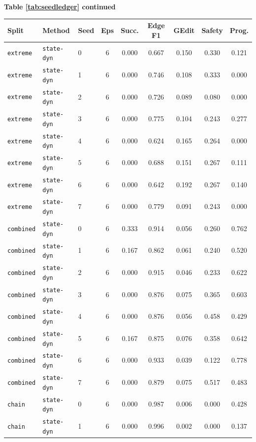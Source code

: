 \documentclass{article}
\begin{document}
\begin{center}
\textbf{Table \ref{tab:seedledger} continued}\\[0.4ex]
\begin{tabular}{lllcccccc}
\toprule
Split & Method & Seed & Eps & Succ. & Edge F1 & GEdit & Safety & Prog. \\
\midrule
\texttt{extreme} & \texttt{state-dyn} & 0 & 6 & 0.000 & 0.667 & 0.150 & 0.330 & 0.121 \\
\texttt{extreme} & \texttt{state-dyn} & 1 & 6 & 0.000 & 0.746 & 0.108 & 0.333 & 0.000 \\
\texttt{extreme} & \texttt{state-dyn} & 2 & 6 & 0.000 & 0.726 & 0.089 & 0.080 & 0.000 \\
\texttt{extreme} & \texttt{state-dyn} & 3 & 6 & 0.000 & 0.775 & 0.104 & 0.243 & 0.277 \\
\texttt{extreme} & \texttt{state-dyn} & 4 & 6 & 0.000 & 0.624 & 0.165 & 0.264 & 0.000 \\
\texttt{extreme} & \texttt{state-dyn} & 5 & 6 & 0.000 & 0.688 & 0.151 & 0.267 & 0.111 \\
\texttt{extreme} & \texttt{state-dyn} & 6 & 6 & 0.000 & 0.642 & 0.192 & 0.267 & 0.140 \\
\texttt{extreme} & \texttt{state-dyn} & 7 & 6 & 0.000 & 0.779 & 0.091 & 0.243 & 0.000 \\
\texttt{combined} & \texttt{state-dyn} & 0 & 6 & 0.333 & 0.914 & 0.056 & 0.260 & 0.762 \\
\texttt{combined} & \texttt{state-dyn} & 1 & 6 & 0.167 & 0.862 & 0.061 & 0.240 & 0.520 \\
\texttt{combined} & \texttt{state-dyn} & 2 & 6 & 0.000 & 0.915 & 0.046 & 0.233 & 0.622 \\
\texttt{combined} & \texttt{state-dyn} & 3 & 6 & 0.000 & 0.876 & 0.075 & 0.365 & 0.603 \\
\texttt{combined} & \texttt{state-dyn} & 4 & 6 & 0.000 & 0.876 & 0.056 & 0.458 & 0.429 \\
\texttt{combined} & \texttt{state-dyn} & 5 & 6 & 0.167 & 0.875 & 0.076 & 0.358 & 0.642 \\
\texttt{combined} & \texttt{state-dyn} & 6 & 6 & 0.000 & 0.933 & 0.039 & 0.122 & 0.778 \\
\texttt{combined} & \texttt{state-dyn} & 7 & 6 & 0.000 & 0.879 & 0.075 & 0.517 & 0.483 \\
\texttt{chain} & \texttt{state-dyn} & 0 & 6 & 0.000 & 0.987 & 0.006 & 0.000 & 0.428 \\
\texttt{chain} & \texttt{state-dyn} & 1 & 6 & 0.000 & 0.996 & 0.002 & 0.000 & 0.137 \\

\end{tabular}
\end{center}
\end{document}

